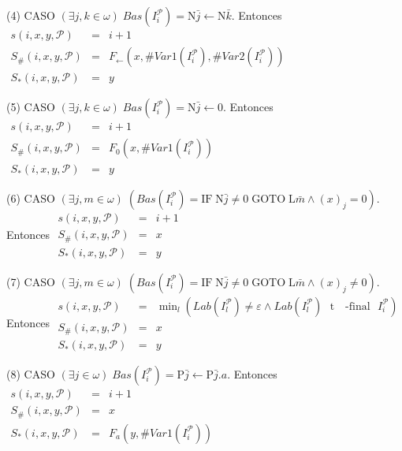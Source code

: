 (4) CASO \((\exists j,k\in \omega )\;Bas(I_{i}^{\mathcal{P}})=\mathrm{N }\bar{j}\leftarrow \mathrm{N}\bar{k}\). Entonces
\(\displaystyle \begin{array}{rcl} s(i,x,y,\mathcal{P}) & =& i+1 \\ S_{\#}(i,x,y,\mathcal{P}) & =& F_{\leftarrow }(x,\#Var1(I_{i}^{\mathcal{P} }),\#Var2(I_{i}^{\mathcal{P}})) \\ S_{\ast }(i,x,y,\mathcal{P}) & =& y \end{array} \)

(5) CASO \((\exists j,k\in \omega )\;Bas(I_{i}^{\mathcal{P}})=\mathrm{N }\bar{j}\leftarrow 0\). Entonces
\(\displaystyle \begin{array}{rcl} s(i,x,y,\mathcal{P}) & =& i+1 \\ S_{\#}(i,x,y,\mathcal{P}) & =& F_{0}(x,\#Var1(I_{i}^{\mathcal{P}})) \\ S_{\ast }(i,x,y,\mathcal{P}) & =& y \end{array} \)

(6) CASO \((\exists j,m\in \omega )\;\left( Bas(I_{i}^{\mathcal{P}})= \mathrm{IF}\;\mathrm{N}\bar{j}\neq 0\;\mathrm{GOTO}\;\mathrm{L}\bar{m}\wedge (x)_{j}=0\right) \). Entonces
\(\displaystyle \begin{array}{rcl} s(i,x,y,\mathcal{P}) & =& i+1 \\ S_{\#}(i,x,y,\mathcal{P}) & =& x \\ S_{\ast }(i,x,y,\mathcal{P}) & =& y \end{array} \)

(7) CASO \((\exists j,m\in \omega )\;\left( Bas(I_{i}^{\mathcal{P}})= \mathrm{IF}\;\mathrm{N}\bar{j}\neq 0\;\mathrm{GOTO}\;\mathrm{L}\bar{m}\wedge (x)_{j}\neq 0\right) \). Entonces
\(\displaystyle \begin{array}{rcl} s(i,x,y,\mathcal{P}) & =& \min_{l}\left( Lab(I_{l}^{\mathcal{P}})\neq \varepsilon \wedge Lab(I_{l}^{\mathcal{P}})\text{ }\mathrm{t}\text{ { -final} }I_{i}^{\mathcal{P}}\right) \\ S_{\#}(i,x,y,\mathcal{P}) & =& x \\ S_{\ast }(i,x,y,\mathcal{P}) & =& y \end{array} \)

(8) CASO \((\exists j\in \omega )\;Bas(I_{i}^{\mathcal{P}})=\mathrm{P} \bar{j}\leftarrow \mathrm{P}\bar{j}.a\). Entonces
\(\displaystyle \begin{array}{rcl} s(i,x,y,\mathcal{P}) & =& i+1 \\ S_{\#}(i,x,y,\mathcal{P}) & =& x \\ S_{\ast }(i,x,y,\mathcal{P}) & =& F_{a}(y,\#Var1(I_{i}^{\mathcal{P}})) \end{array} \)

